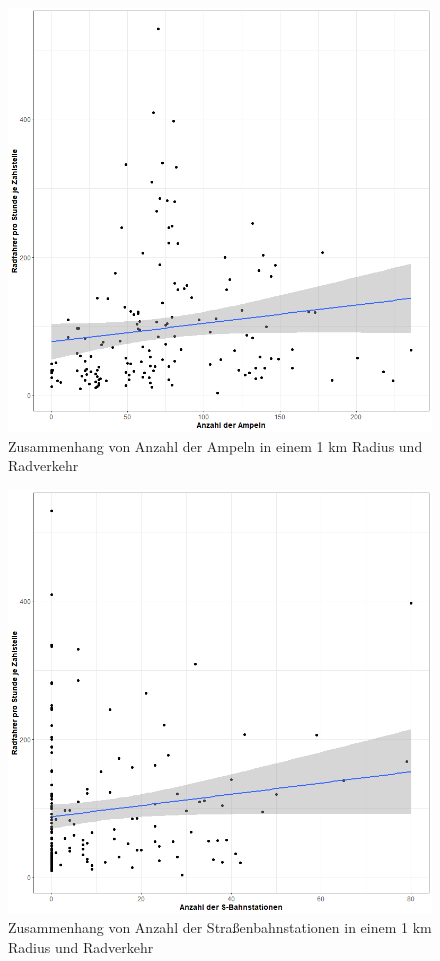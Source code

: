 \documentclass[a4paper,12pt]{thesis}
\begin{document}
\begin{figure}[!ht]
	\centering
	\includegraphics[width=\textwidth]{Plots/plot17.png}
	\caption{Zusammenhang von Anzahl der Ampeln in einem 1 km Radius und Radverkehr}
	\label{Signals}
\end{figure}

\begin{figure}[!ht]
	\centering
	\includegraphics[width=\textwidth]{Plots/plot18.png}
	\caption{Zusammenhang von Anzahl der Straßenbahnstationen in einem 1 km Radius und Radverkehr}
	\label{Trams}
\end{figure}
\end{document}
